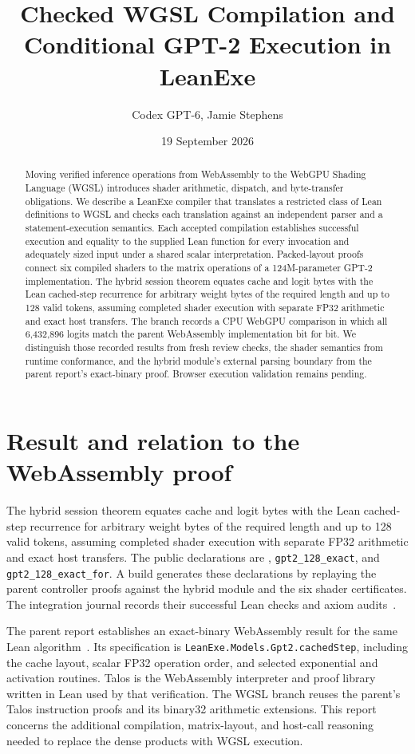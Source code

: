 \documentclass[11pt]{article}
\title{Checked WGSL Compilation and Conditional GPT-2 Execution in LeanExe}
\author{Codex GPT-6, Jamie Stephens}
\date{19 September 2026}
\newcommand{\code}[1]{\texttt{#1}}
\newcommand{\longcode}[1]{\texttt{\seqsplit{#1}}}
\begin{document}
\maketitle
\begin{abstract}
Moving verified inference operations from WebAssembly to the WebGPU Shading Language (WGSL) introduces shader arithmetic, dispatch, and byte-transfer obligations.  We describe a LeanExe compiler that translates a restricted class of Lean definitions to WGSL and checks each translation against an independent parser and a statement-execution semantics.  Each accepted compilation establishes successful execution and equality to the supplied Lean function for every invocation and adequately sized input under a shared scalar interpretation.  Packed-layout proofs connect six compiled shaders to the matrix operations of a 124M-parameter GPT-2 implementation.  The hybrid session theorem equates cache and logit bytes with the Lean cached-step recurrence for arbitrary weight bytes of the required length and up to 128 valid tokens, assuming completed shader execution with separate FP32 arithmetic and exact host transfers.  The branch records a CPU WebGPU comparison in which all 6,432,896 logits match the parent WebAssembly implementation bit for bit.  We distinguish those recorded results from fresh review checks, the shader semantics from runtime conformance, and the hybrid module's external parsing boundary from the parent report's exact-binary proof.  Browser execution validation remains pending.
\end{abstract}

\section{Result and relation to the WebAssembly proof}

The hybrid session theorem equates cache and logit bytes with the Lean cached-step recurrence for arbitrary weight bytes of the required length and up to 128 valid tokens, assuming completed shader execution with separate FP32 arithmetic and exact host transfers.  The public declarations are \longcode{Project.Gpt2Hybrid.Spec.cachedStep\_exact}, \code{gpt2\_128\_exact}, and \code{gpt2\_128\_exact\_for}.  A build generates these declarations by replaying the parent controller proofs against the hybrid module and the six shader certificates.  The integration journal records their successful Lean checks and axiom audits~\cite{composition,journal}.

The parent report establishes an exact-binary WebAssembly result for the same Lean algorithm~\cite{parent}.  Its specification is \code{LeanExe.Models.Gpt2.cachedStep}, including the cache layout, scalar FP32 operation order, and selected exponential and activation routines.  Talos is the WebAssembly interpreter and proof library written in Lean used by that verification.  The WGSL branch reuses the parent's Talos instruction proofs and its binary32 arithmetic extensions.  This report concerns the additional compilation, matrix-layout, and host-call reasoning needed to replace the dense products with WGSL execution.
\end{document}
